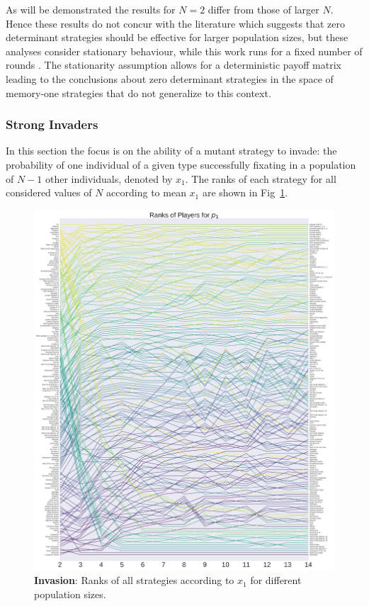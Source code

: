 \documentclass[10pt,letterpaper]{article}
\begin{document}
As will be demonstrated the results for
\(N=2\) differ from those of larger $N$. Hence these results do not concur with
the literature which suggests that zero determinant strategies should be
effective for larger population sizes, but these analyses consider stationary
behaviour, while this work runs for a fixed number of rounds \cite{stewart2013extortion}.
The stationarity assumption allows for a deterministic payoff matrix
leading to the conclusions about zero determinant strategies in the space
of memory-one strategies that do not generalize to this context.


\subsubsection*{Strong Invaders}

In this section the focus is on the ability of a mutant strategy to invade: the
probability of one individual of a given type successfully fixating in a
population of \(N - 1\) other individuals, denoted by \(x_1\). The ranks of each
strategy for all considered values of \(N\) according to mean \(x_1\) are shown
in Fig~\ref{fig:ranks_v_size_invade}.

\begin{figure}[!hbtp]
    \centering
    \includegraphics[width=\columnwidth]{./average_rank_vs_population_size_invade.pdf}
    \caption{\textbf{Invasion}: Ranks of all strategies according to \(x_1\) for different population sizes.}
    \label{fig:ranks_v_size_invade}
\end{figure}
\end{document}
